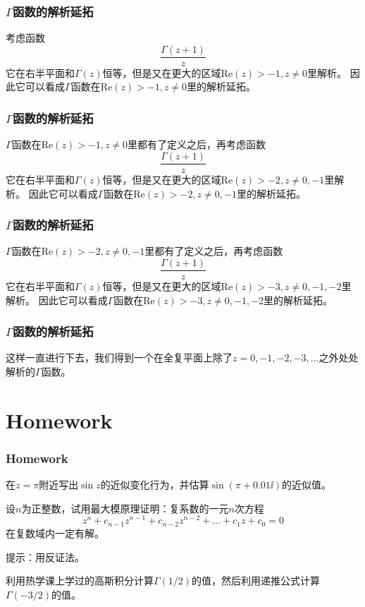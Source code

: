\documentclass[CJK, 13pt]{beamer}
\begin{document}
\begin{frame}
  \frametitle{$\Gamma$函数的解析延拓}
  
  考虑函数
  $$ \frac{\Gamma(z+1)}{z} $$
  它在右半平面和$\Gamma(z)$恒等，但是又在更大的区域$\mathrm{Re}(z)>-1, z\ne 0$里解析。
  因此它可以看成$\Gamma$函数在$\mathrm{Re}(z)>-1, z\ne 0$里的解析延拓。

  
\end{frame}


\begin{frame}
  \frametitle{$\Gamma$函数的解析延拓}
  
  $\Gamma$函数在$\mathrm{Re}(z)>-1, z\ne 0$里都有了定义之后，再考虑函数
  $$ \frac{\Gamma(z+1)}{z} $$
  它在右半平面和$\Gamma(z)$恒等，但是又在更大的区域$\mathrm{Re}(z)>-2, z\ne 0, -1$里解析。
  因此它可以看成$\Gamma$函数在$\mathrm{Re}(z)>-2, z\ne 0, -1$里的解析延拓。
  
\end{frame}


\begin{frame}
  \frametitle{$\Gamma$函数的解析延拓}
  
  $\Gamma$函数在$\mathrm{Re}(z)>-2, z\ne 0,-1$里都有了定义之后，再考虑函数
  $$ \frac{\Gamma(z+1)}{z} $$
  它在右半平面和$\Gamma(z)$恒等，但是又在更大的区域$\mathrm{Re}(z)>-3, z\ne 0, -1,-2$里解析。
  因此它可以看成$\Gamma$函数在$\mathrm{Re}(z)>-3, z\ne 0, -1,-2$里的解析延拓。
  
\end{frame}


\begin{frame}
  \frametitle{$\Gamma$函数的解析延拓}
  
  这样一直进行下去，我们得到一个在全复平面上除了$z=0,-1,-2,-3,\ldots$之外处处解析的$\Gamma$函数。

  
\end{frame}



\section{Homework}

\begin{frame}
  \frametitle{Homework}
  
  \bitem
\item{在$z=\pi$附近写出$\sin z$的近似变化行为，并估算$\sin(\pi + 0.01\ii)$的近似值。}
\item{设$n$为正整数，试用最大模原理证明：复系数的一元$n$次方程
  $$z^n+c_{n-1}z^{n-1}+c_{n-2}z^{n-2}+\ldots + c_1z + c_0 = 0$$
  在复数域内一定有解。

  提示：用反证法。}
\item{利用热学课上学过的高斯积分计算$\Gamma(1/2)$的值，然后利用递推公式计算$\Gamma(-3/2)$的值。}

  \eitem
  
\end{frame}

\ech
\end{document}
